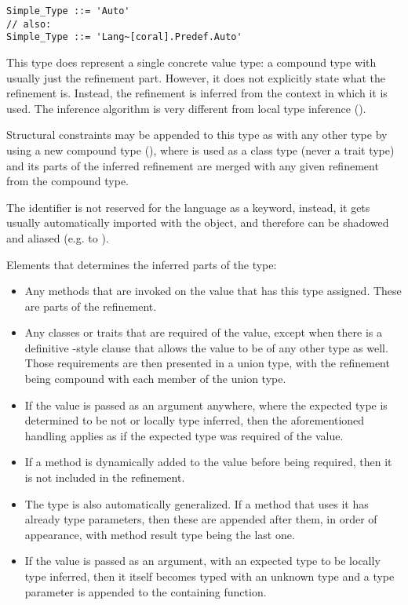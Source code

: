 \syntax\begin{lstlisting}[morekeywords={Auto}]
Simple_Type ::= 'Auto'
// also:
Simple_Type ::= 'Lang~[coral].Predef.Auto'
\end{lstlisting}

This type does represent a single concrete value type: a compound type with usually just the refinement part. However, it does not explicitly state what the refinement is. Instead, the refinement is inferred from the context in which it is used. The inference algorithm is very different from local type inference (). 

Structural constraints may be appended to this type as with any other type by using a new compound type (), where  is used as a class type (never a trait type) and its parts of the inferred refinement are merged with any given refinement from the compound type. 

The  identifier is not reserved for the language as a keyword, instead, it gets usually automatically imported with the  object, and therefore can be shadowed and aliased (e.g. to ). 

Elements that determines the inferred parts of the  type:

\begin{itemize}
  \item Any methods that are invoked on the value that has this type assigned. These are parts of the refinement. 
  \item Any classes or traits that are required of the value, except when there is a definitive -style clause that allows the value to be of any other type as well. Those requirements are then presented in a union type, with the refinement being compound with each member of the union type. 
  \item If the value is passed as an argument anywhere, where the expected type is determined to be not  or locally type inferred, then the aforementioned handling applies as if the expected type was required of the value.
  \item If a method is dynamically added to the value before being required, then it is not included in the refinement. 
  \item The  type is also automatically generalized. If a method that uses it has already type parameters, then these are appended after them, in order of appearance, with method result type being the last one. 
  \item If the value is passed as an argument, with an expected type to be locally type inferred, then it itself becomes typed with an unknown type and a type parameter is appended to the containing function.
\end{itemize}

